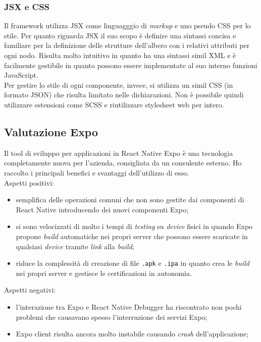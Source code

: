 \subsubsection{JSX e CSS}
Il framework utilizza JSX come linguagggio di \emph{markup} e uno pseudo CSS per lo stile.
Per quanto riguarda JSX il suo scopo è definire una sintassi concisa e familiare per la definizione delle strutture dell'albero con i relativi attributi per ogni nodo. Risulta molto intuitivo in quanto ha una sintassi simil XML e è facilmente gestibile in quanto possono essere implementate al suo interno funzioni JavaScript.\\
Per gestire lo stile di ogni componente, invece,  si utilizza un simil CSS (in formato JSON) che risulta limitato nelle dichiarazioni. Non è possibile quindi utilizzare estensioni come SCSS e riutilizzare stylesheet web per intero. 

\subsection{Valutazione Expo}
Il tool di sviluppo per applicazioni in React Native Expo è una tecnologia completamente nuova per l'azienda, consigliata da un consulente esterno. Ho raccolto i principali benefici e svantaggi dell'utilizzo di esso.\\
Aspetti positivi:
\begin{itemize}
	\item semplifica delle operazioni comuni che non sono gestite dai componenti di React Native introducendo dei nuovi componenti Expo;
	\item si sono velocizzati di molto i tempi di \emph{testing} su \emph{device} fisici in quando Expo propone \emph{build} automatiche nei propri server che possono essere scaricate in qualsiasi \emph{device} tramite \emph{link} alla \emph{build};
	\item riduce la complessità di creazione di file \texttt{.apk} e \texttt{.ipa} in quanto crea le \emph{build} nei propri server e gestisce le certificazioni in autonomia.
\end{itemize}
Aspetti negativi:
\begin{itemize}
	\item l'interazione tra Expo e React Native Debugger ha riscontrato non pochi problemi che causavano spesso l'interruzione dei servizi Expo;
	\item Expo client risulta ancora molto instabile causando \emph{crash} dell'applicazione;
\end{itemize}

